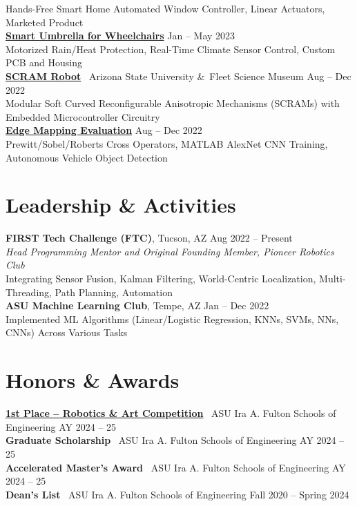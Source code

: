 \documentclass[10pt]{article}
\begin{document}
\hspace*{2em}Hands-Free Smart Home Automated Window Controller, Linear Actuators, Marketed Product
\\
\textbf{\href{https://EGR314-Team205.github.io}{Smart Umbrella for Wheelchairs}} \hfill Jan -- May 2023 \\
\hspace*{2em}Motorized Rain/Heat Protection, Real-Time Climate Sensor Control, Custom PCB and Housing
\\
\textbf{\href{https://www.youtube.com/watch?v=rs_C8sR2_co}{SCRAM Robot}} \textbar\ Arizona State University \&\ Fleet Science Museum \hfill Aug -- Dec 2022 \\
\hspace*{2em}Modular Soft Curved Reconfigurable Anisotropic Mechanisms (SCRAMs) with Embedded Microcontroller Circuitry
\\
\textbf{\href{https://github.com/MGross21/EdgeMappingResearchProject}{Edge Mapping Evaluation}} \hfill Aug -- Dec 2022 \\
\hspace*{2em}Prewitt/Sobel/Roberts Cross Operators, MATLAB AlexNet CNN Training, Autonomous Vehicle Object Detection

\section*{Leadership \& Activities}
\textbf{FIRST Tech Challenge (FTC)}, Tucson, AZ \hfill Aug 2022 -- Present \\
\textit{Head Programming Mentor and Original Founding Member, Pioneer Robotics Club}\\
\hspace*{2em}Integrating Sensor Fusion, Kalman Filtering, World-Centric Localization, Multi-Threading, Path Planning, Automation
\\
\textbf{ASU Machine Learning Club}, Tempe, AZ \hfill Jan -- Dec 2022 \\
\hspace*{2em}Implemented ML Algorithms (Linear/Logistic Regression, KNNs, SVMs, NNs, CNNs) Across Various Tasks

\section*{Honors \& Awards}
\textbf{\href{https://www.linkedin.com/posts/mhgross_asuengineering-design-robotics-activity-7324315472491855873-Gn_C}{1st Place -- Robotics \& Art Competition}} \textbar\ ASU Ira A. Fulton Schools of Engineering \hfill AY 2024 -- 25 \\
\textbf{Graduate Scholarship} \textbar\ ASU Ira A. Fulton Schools of Engineering \hfill AY 2024 -- 25 \\
\textbf{Accelerated Master's Award} \textbar\ ASU Ira A. Fulton Schools of Engineering \hfill AY 2024 -- 25\\
\textbf{Dean's List} \textbar\ ASU Ira A. Fulton Schools of Engineering \hfill Fall 2020 -- Spring 2024
\end{document}
